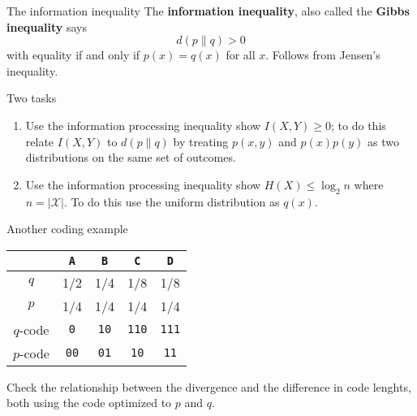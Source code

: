 \documentclass{beamer}
\newcommand{\crish}{\color{reddish}}
\newcommand{\cbla}{\color{black}}
\newcommand{\letter}[1]{\color{blue}\texttt{#1}\color{black}}
\newcommand{\binary}[1]{\color{red}\texttt{#1}\color{black}}
\begin{document}
\begin{frame}{The information inequality}
  The \textbf{information inequality}, also called the \textbf{Gibbs inequality} says
  \crish
  $$d(p\|q)>0$$
  \cbla
  with equality if and only if \crish$p(x)=q(x)$\cbla{} for all \crish$x$\cbla{}. Follows from Jensen's inequality.
\end{frame}

\begin{frame}{Two tasks}
  \begin{enumerate}
    \item Use the information processing inequality show
      \crish$I(X,Y)\ge 0$\cbla; to do this relate
      \crish$I(X,Y)$\cbla{} to \crish$d(p\|q)$\cbla{} by treating
      \crish$p(x,y)$\cbla{} and \crish$p(x)p(y)$\cbla{} as two
      distributions on the same set of outcomes.
    \item Use the information processing inequality show
      \crish$H(X)\le \log_2{n}$\cbla{} where
      \crish$n=|\mathcal{X}|$\cbla. To do this use the uniform
      distribution as $q(x)$.
  \end{enumerate}
\end{frame}


\begin{frame}{Another coding example}

\begin{center}
\begin{tabular}{c|cccc}
&\letter{A}&\letter{B}&\letter{C}&\letter{D}\\
\hline
$q$&1/2&1/4&1/8&1/8\\
$p$&1/4&1/4&1/4&1/4\\
\hline
$q$-code&\binary{0}&\binary{10}&\binary{110}&\binary{111}\\
$p$-code&\binary{00}&\binary{01}&\binary{10}&\binary{11}
\end{tabular}
\end{center}
\crish Check the relationship between the divergence and the
difference in code lenghts, both using the code optimized to
\crish$p$\cbla{} and \crish$q$\cbla{}.  \cbla
\end{frame}
\end{document}
